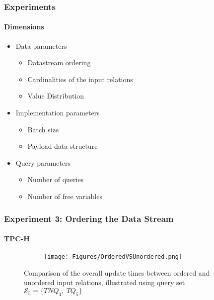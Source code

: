 \documentclass[
	11pt, %
]{beamer}
\begin{document}
\begin{frame}
	\frametitle{Experiments}
	\framesubtitle{Dimensions}
	\begin{itemize}
		\item Data parameters
		\begin{itemize}
			\item Datastream ordering
			\item Cardinalities of the input relations
			\item Value Distribution
		\end{itemize}
		\item Implementation parameters
		\begin{itemize}
			\item Batch size
			\item Payload data structure
		\end{itemize}
		\item Query parameters
		\begin{itemize}
			\item Number of queries
			\item Number of free variables
		\end{itemize}
	\end{itemize}
\end{frame}

\begin{frame}
	\frametitle{Experiment 3: Ordering the Data Stream}
	\framesubtitle{TPC-H}
	\begin{figure}


		\begin{minipage}{0.25\textwidth}
		\end{minipage}
		\begin{minipage}{0.74\textwidth}
			\begin{figure}
				\centering
				\texttt{[image: Figures/OrderedVSUnordered.png]}
			\end{figure}
		\end{minipage}
		\caption{Comparison of the overall update times between ordered and unordered input relations, illustrated using query set $\mathcal{S}_5 = \{TNQ_4,\ TQ_5\}$}
		\label{fig:orderedVSunordered}
	\end{figure}
\end{frame}
\end{document}
